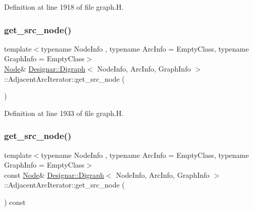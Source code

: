 Definition at line 1918 of file graph.\+H.

\mbox{\label{class_designar_1_1_digraph_1_1_adjacent_arc_iterator_a72e125198f4cea2ab0ac1213c1cbc1e4}} 
\subsubsection{\texorpdfstring{get\+\_\+src\+\_\+node()}{get\_src\_node()}\hspace{0.1cm}{\footnotesize\ttfamily [1/2]}}
{\footnotesize\ttfamily template$<$typename Node\+Info , typename Arc\+Info  = Empty\+Class, typename Graph\+Info  = Empty\+Class$>$ \\
\hyperlink{class_designar_1_1_digraph_a4dc921c41a480b7946a04170e997d8ae}{Node}\& \hyperlink{class_designar_1_1_digraph}{Designar\+::\+Digraph}$<$ Node\+Info, Arc\+Info, Graph\+Info $>$\+::Adjacent\+Arc\+Iterator\+::get\+\_\+src\+\_\+node (\begin{DoxyParamCaption}{ }\end{DoxyParamCaption})\hspace{0.3cm}{\ttfamily [inline]}}



Definition at line 1933 of file graph.\+H.

\mbox{\label{class_designar_1_1_digraph_1_1_adjacent_arc_iterator_a09c51f5124610cd6e5360dc7039b4639}} 
\subsubsection{\texorpdfstring{get\+\_\+src\+\_\+node()}{get\_src\_node()}\hspace{0.1cm}{\footnotesize\ttfamily [2/2]}}
{\footnotesize\ttfamily template$<$typename Node\+Info , typename Arc\+Info  = Empty\+Class, typename Graph\+Info  = Empty\+Class$>$ \\
const \hyperlink{class_designar_1_1_digraph_a4dc921c41a480b7946a04170e997d8ae}{Node}\& \hyperlink{class_designar_1_1_digraph}{Designar\+::\+Digraph}$<$ Node\+Info, Arc\+Info, Graph\+Info $>$\+::Adjacent\+Arc\+Iterator\+::get\+\_\+src\+\_\+node (\begin{DoxyParamCaption}{ }\end{DoxyParamCaption}) const\hspace{0.3cm}{\ttfamily [inline]}}



